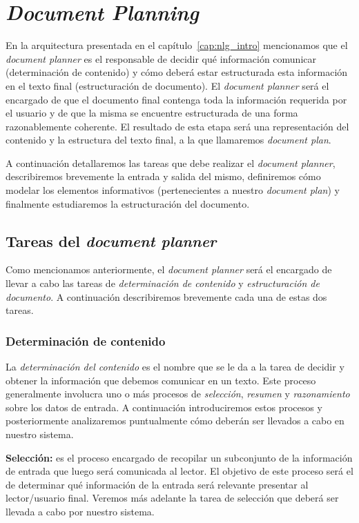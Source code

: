 \chapter{\textit{Document Planning}}
\label{cap:document_planning}

En la arquitectura presentada en el capítulo~\ref{cap:nlg_intro} mencionamos que el \emph{document planner} es el responsable de decidir qué información comunicar (determinación de contenido) y cómo deberá estar estructurada esta información en el texto final (estructuración de documento). El \textit{document planner} será el encargado de que el documento final contenga toda la información requerida por el usuario y de que la misma se encuentre estructurada de una forma razonablemente coherente. El resultado de esta etapa será una representación del contenido y la estructura del texto final, a la que llamaremos \emph{document plan}.

A continuación detallaremos las tareas que debe realizar el \textit{document planner}, describiremos brevemente la entrada y salida del mismo, definiremos cómo modelar los elementos informativos (pertenecientes a nuestro \emph{document plan}) y finalmente estudiaremos la estructuración del documento.

\section{Tareas del \textit{document planner}}
Como mencionamos anteriormente, el \textit{document planner} será el encargado de llevar a cabo las tareas de \emph{determinación de contenido} y \emph{estructuración de documento}. A continuación describiremos brevemente cada una de estas dos tareas.

\subsection*{Determinación de contenido}

La \emph{determinación del contenido} es el nombre que se le da a la tarea de decidir y obtener la información que debemos comunicar en un texto. Este proceso generalmente involucra uno o más procesos de \emph{selección}, \emph{resumen} y \emph{razonamiento} sobre los datos de entrada. A continuación introduciremos estos procesos y posteriormente analizaremos puntualmente cómo deberán ser llevados a cabo en nuestro sistema.

\bigskip
\noindent
\textbf{Selección:} es el proceso encargado de recopilar un subconjunto de la información de entrada que luego será comunicada al lector. El objetivo de este proceso será el de determinar qué información de la entrada será relevante presentar al lector/usuario final. Veremos más adelante la tarea de selección que deberá ser llevada a cabo por nuestro sistema.

